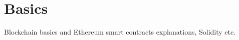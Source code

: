 \section{Basics}
\pagebreak
Blockchain basics and Ethereum smart contracts explanations, Solidity etc.